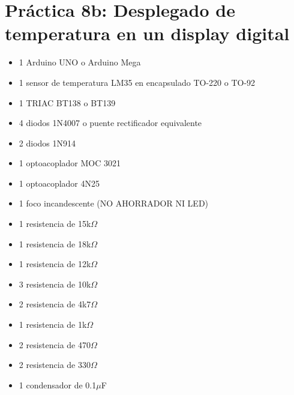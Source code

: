 \documentclass[letterpaper,10.5pt]{article}
\begin{document}
\section{Práctica 8b: Desplegado de temperatura en un display digital} %
\begin{itemize}[noitemsep]
	\item 1 Arduino UNO o Arduino Mega
	\item 1 sensor de temperatura LM35 en encapsulado TO-220 o TO-92
	\item 1 TRIAC BT138 o BT139
	\item 4 diodos 1N4007 o puente rectificador equivalente
	\item 2 diodos 1N914
	\item 1 optoacoplador MOC 3021
	\item 1 optoacoplador 4N25
	\item 1 foco incandescente (NO AHORRADOR NI LED)
	\item 1 resistencia de 15k$\Omega$
	\item 1 resistencia de 18k$\Omega$
	\item 1 resistencia de 12k$\Omega$
	\item 3 resistencia de 10k$\Omega$
	\item 2 resistencia de 4k7$\Omega$
	\item 1 resistencia de  1k$\Omega$
	\item 2 resistencia de 470$\Omega$
	\item 2 resistencia de 330$\Omega$
	\item 1 condensador de 0.1$\mu$F
\end{itemize}
\end{document}
